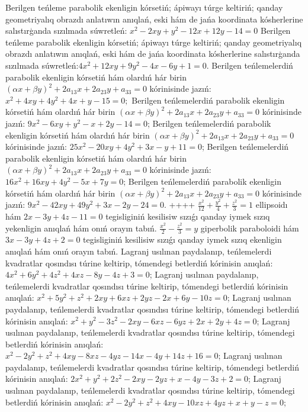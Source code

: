 Berilgen teńleme parabolik ekenligin kórsetiń; ápiwayı túrge keltiriń; qanday geometriyalıq obrazdı anlatıwın anıqlań, eski hám de jańa koordinata kósherlerine salıstırģanda sızılmada súwretleń: $x^2-2 x y+y^2-12 x+12 y-14=0$
Berilgen teńleme parabolik ekenligin kórsetiń; ápiwayı túrge keltiriń; qanday geometriyalıq obrazdı anlatıwın anıqlań, eski hám de jańa koordinata kósherlerine salıstırģanda sızılmada súwretleń:$4 x^2+12 x y+9 y^2-4 x-6 y+1=0$.
Berilgen teńlemelerdiń parabolik ekenligin kórsetiń hám olardıń hár birin $(\alpha x+\beta y)^2+2 a_{13} x+2 a_{23} y+a_{33}=0$ kórinisinde jazıń: $x^2+4 x y+4 y^2+4 x+y-15=0 ;$
Berilgen teńlemelerdiń parabolik ekenligin kórsetiń hám olardıń hár birin $(\alpha x+\beta y)^2+2 a_{13} x+2 a_{23} y+a_{33}=0$ kórinisinde jazıń: $9 x^2-6 x y+y^2-x+2 y-14=0$;
Berilgen teńlemelerdiń parabolik ekenligin kórsetiń hám olardıń hár birin $(\alpha x+\beta y)^2+2 a_{13} x+2 a_{23} y+a_{33}=0$ kórinisinde jazıń: $25 x^2-20 x y+4 y^2+3 x-y+11=0$;
Berilgen teńlemelerdiń parabolik ekenligin kórsetiń hám olardıń hár birin $(\alpha x+\beta y)^2+2 a_{13} x+2 a_{23} y+a_{33}=0$ kórinisinde jazıń:  $16 x^2+16 x y+4 y^2-5 x+7 y=0$;
Berilgen teńlemelerdiń parabolik ekenligin kórsetiń hám olardıń hár birin $(\alpha x+\beta y)^2+2 a_{13} x+2 a_{23} y+a_{33}=0$ kórinisinde jazıń:  $9 x^2-42 x y+49 y^2+3 x-2 y-24=0$.
++++
$\frac{x^2}{12}+\frac{y^2}{4}+\frac{z^2}{3}=1$ ellipsoidı hám $2x-3y+4z-11=0$ tegisliginiń kesilisiw sızıǵı qanday iymek sızıq yekenligin anıqlań hám onıń orayın tabıń.
$\frac{x^2}{2}-\frac{z^2}{3}=y$ giperbolik paraboloidi hám $3x-3y+4z+2=0$ tegisliginiń kesilisiw sızıǵı qanday iymek sızıq ekenligin anıqlań hám onıń orayın tabıń.
Lagranj usılınan paydalanıp, teńlemelerdi kvadratlar qosındısı túrine keltirip, tómendegi betlerdiń kórinisin anıqlań: $4 x^2+6 y^2+4 z^2+4 x z-8 y-4 z+3=0$;
Lagranj usılınan paydalanıp, teńlemelerdi kvadratlar qosındısı túrine keltirip, tómendegi betlerdiń kórinisin anıqlań: $x^2+5 y^2+z^2+2 x y+6 x z+2 y z-2 x+6 y-10 z=0$;
Lagranj usılınan paydalanıp, teńlemelerdi kvadratlar qosındısı túrine keltirip, tómendegi betlerdiń kórinisin anıqlań: $x^2+y^2-3 z^2-2 x y-6 x z-6 y z+2 x+2 y+4 z=0$;
Lagranj usılınan paydalanıp, teńlemelerdi kvadratlar qosındısı túrine keltirip, tómendegi betlerdiń kórinisin anıqlań: $x^2-2 y^2+z^2+4 x y-8 x z-4 y z-14 x-4 y+14 z+16=0$;
Lagranj usılınan paydalanıp, teńlemelerdi kvadratlar qosındısı túrine keltirip, tómendegi betlerdiń kórinisin anıqlań: $2 x^2+y^2+2 z^2-2 x y-2 y z+x-4 y-3 z+2=0$;
Lagranj usılınan paydalanıp, teńlemelerdi kvadratlar qosındısı túrine keltirip, tómendegi betlerdiń kórinisin anıqlań: $x^2-2 y^2+z^2+4 x y-10 x z+4 y z+x+y-z=0$;
